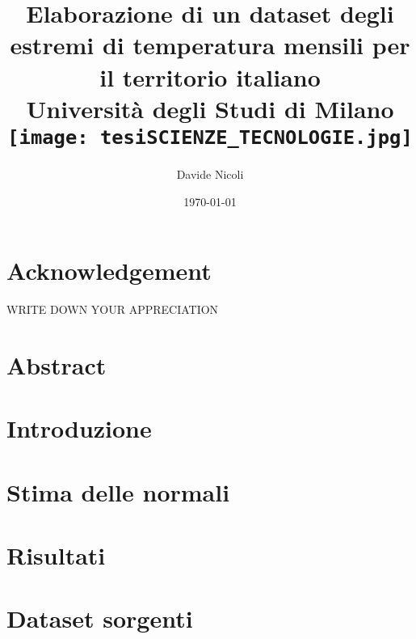 \documentclass[a4paper, 12pt]{report}
\title{
  {Elaborazione di un dataset degli estremi di temperatura mensili per il territorio italiano}\\
  {\large{Università degli Studi di Milano}}\\
  {\texttt{[image: tesiSCIENZE\_TECNOLOGIE.jpg]}}
}
\author{Davide Nicoli}
\date{\today}
\begin{document}
\maketitle

\chapter*{Acknowledgement}
\noindent WRITE DOWN YOUR APPRECIATION

\chapter*{Abstract}

\tableofcontents
\listoffigures
\listoftables


\chapter{Introduzione}\label{ch:intro}


\chapter{Stima delle normali}\label{ch:stimanormali}


\chapter{Risultati}\label{ch:risultati}


\appendix
\chapter{Dataset sorgenti}\label{app:datasets}


\clearpage
\printbibliography{}
\end{document}
